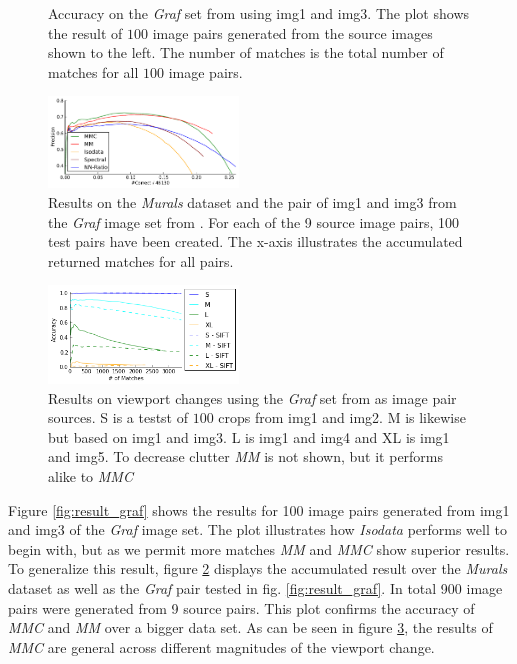 \documentclass[12pt,journal]{IEEEtran}
\begin{document}
\begin{figure}
{\begin{subfigure}[t]{.27\textwidth}
		\end{subfigure}%
	}%
	\label{fig:results_graf}
	\caption{Accuracy on the \emph{Graf} set from 
		\cite{mikolajczyk2005performance} using img1 and img3. The plot 
	shows the result of $100$ image pairs generated from the source 
images shown to the left. The number of matches is the total number of 
matches for all $100$ image pairs.}
\end{figure}

\begin{figure}
	\centering
	\includegraphics[width=0.45\textwidth]{images/result_accumulated}
	\caption{Results on the \emph{Murals} dataset and the pair of img1 
		and img3 from the \emph{Graf} image set from 	
		\cite{mikolajczyk2005performance}. For each of the 9 source 
		image pairs, 100 test pairs have been created.  The x-axis 
	illustrates the accumulated returned matches for all pairs.}
	\label{fig:result_accumulated}
\end{figure}

\begin{figure}
	\centering
	\includegraphics[width=0.45\textwidth]{images/result_viewport}
	\caption{Results on viewport changes using the \emph{Graf} set from 
		\cite{mikolajczyk2005performance} as image pair sources. S is a 
		testst of $100$ crops from img1 and img2. M is likewise but 
	based on img1 and img3.  L is img1 and img4 and XL is img1 and img5.  
To decrease clutter \emph{MM} is not shown, but it performs alike to 
\emph{MMC}}
	\label{fig:result_viewport}
\end{figure}

Figure \ref{fig:result_graf} shows the results for 100 image pairs 
generated from img1 and img3 of the \emph{Graf} image set. The plot 
illustrates how \emph{Isodata} performs well to begin with, but as we 
permit more matches \emph{MM} and \emph{MMC} show superior results. To 
generalize this result, figure \ref{fig:result_accumulated} displays the 
accumulated result over the \emph{Murals} dataset as well as the 
\emph{Graf} pair tested in fig. \ref{fig:result_graf}. In total 900 
image pairs were generated from 9 source pairs. This plot confirms the 
accuracy of \emph{MMC} and \emph{MM} over a bigger data set. As can be 
seen in figure \ref{fig:result_viewport}, the results of \emph{MMC} are 
general across different magnitudes of the viewport change.
\end{document}
